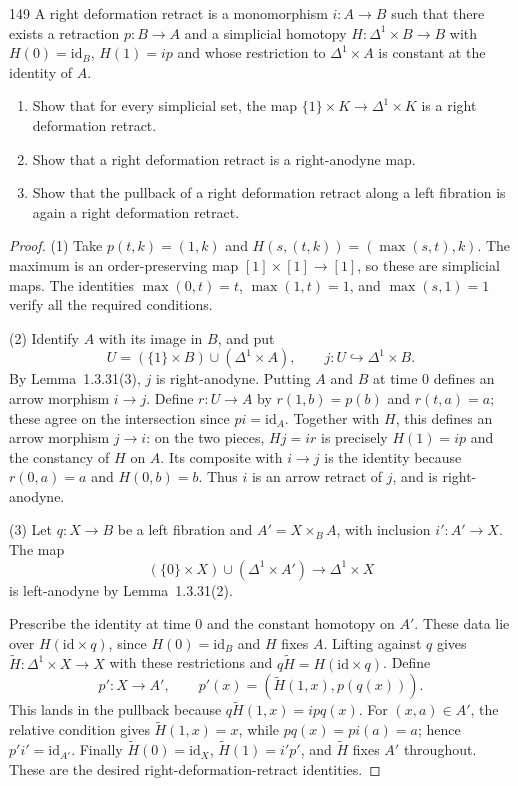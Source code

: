 \begin{exercise}{149}
A right deformation retract is a monomorphism $i\colon A\to B$ such that there
exists a retraction $p\colon B\to A$ and a simplicial homotopy $H\colon\Delta^1\times B\to B$ with $H(0)=\mathrm{id}_B$,
$H(1)=ip$ and whose restriction to $\Delta^1\times A$ is constant at the identity of $A$.
\begin{enumerate}[label=(\arabic*)]
\item Show that for every simplicial set, the map $\{1\}\times K\to\Delta^1\times K$ is a right deformation
retract.
\item Show that a right deformation retract is a right-anodyne map.
\item Show that the pullback of a right deformation retract along a left fibration is again a right
deformation retract.
\end{enumerate}

\begin{proof}
(1) Take $p(t,k)=(1,k)$ and
$H(s,(t,k))=(\max(s,t),k)$.
The maximum is an order-preserving map $[1]\times[1]\to[1]$,
so these are simplicial maps.
The identities $\max(0,t)=t$, $\max(1,t)=1$, and
$\max(s,1)=1$ verify all the required conditions.

(2) Identify $A$ with its image in $B$, and put
\[
 U=(\{1\}\times B)\cup(\Delta^1\times A),
 \qquad j\colon U\hookrightarrow\Delta^1\times B.
\]
By Lemma~1.3.31(3), $j$ is right-anodyne.
Putting $A$ and $B$ at time $0$ defines an arrow morphism $i\to j$.
Define $r\colon U\to A$ by $r(1,b)=p(b)$ and $r(t,a)=a$;
these agree on the intersection since $pi=\mathrm{id}_A$.
Together with $H$, this defines an arrow morphism $j\to i$:
on the two pieces, $Hj=ir$ is precisely $H(1)=ip$
and the constancy of $H$ on $A$.
Its composite with $i\to j$ is the identity because
$r(0,a)=a$ and $H(0,b)=b$.
Thus $i$ is an arrow retract of $j$, and is right-anodyne.

\begin{samepage}
(3) Let $q\colon X\to B$ be a left fibration and
$A'=X\times_B A$, with inclusion $i'\colon A'\to X$.
The map
\[
 (\{0\}\times X)\cup(\Delta^1\times A')
 \longrightarrow\Delta^1\times X
\]
is left-anodyne by Lemma~1.3.31(2).
\par
\end{samepage}
Prescribe the identity at time $0$ and the constant homotopy on $A'$.
These data lie over $H(\mathrm{id}\times q)$, since $H(0)=\mathrm{id}_B$
and $H$ fixes $A$. Lifting against $q$ gives
$\widetilde H\colon\Delta^1\times X\to X$ with these restrictions and
$q\widetilde H=H(\mathrm{id}\times q)$.
Define
\[
 p'\colon X\longrightarrow A',\qquad
 p'(x)=(\widetilde H(1,x),p(q(x))).
\]
This lands in the pullback because
$q\widetilde H(1,x)=ipq(x)$.
For $(x,a)\in A'$, the relative condition gives
$\widetilde H(1,x)=x$, while $pq(x)=pi(a)=a$; hence
$p'i'=\mathrm{id}_{A'}$.
Finally $\widetilde H(0)=\mathrm{id}_X$,
$\widetilde H(1)=i'p'$, and $\widetilde H$ fixes $A'$ throughout.
These are the desired right-deformation-retract identities.
\end{proof}
\end{exercise}
